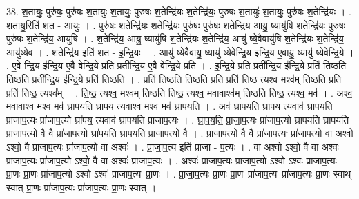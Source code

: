 \documentclass[17pt]{extarticle}
\begin{document}
38. श॒तायुः॒ पुरु॑षः॒ पुरु॑षः श॒तायुः॑ श॒तायुः॒ पुरु॑षः श॒तेन्द्रि॑यः श॒तेन्द्रि॑यः॒ पुरु॑षः श॒तायुः॑ श॒तायुः॒ पुरु॑षः श॒तेन्द्रि॑यः । . श॒तायु॒रिति॑ श॒त - आ॒युः॒ । . पुरु॑षः श॒तेन्द्रि॑यः श॒तेन्द्रि॑यः॒ पुरु॑षः॒ पुरु॑षः श॒तेन्द्रि॑य॒ आयु॒ ष्यायु॑षि श॒तेन्द्रि॑यः॒ पुरु॑षः॒ पुरु॑षः श॒तेन्द्रि॑य॒ आयु॑षि । . श॒तेन्द्रि॑य॒ आयु॒ ष्यायु॑षि श॒तेन्द्रि॑यः श॒तेन्द्रि॑य॒ आयु॑ ष्ये॒वैवायु॑षि श॒तेन्द्रि॑यः श॒तेन्द्रि॑य॒ आयु॑ष्ये॒व । . श॒तेन्द्रि॑य॒ इति॑ श॒त - इ॒न्द्रि॒यः॒ । . आयु॑ ष्ये॒वैवायु॒ ष्यायु॑ ष्ये॒वेन्द्रि॒य इ॑न्द्रि॒य ए॒वायु॒ ष्यायु॑ ष्ये॒वेन्द्रि॒ये । . ए॒वे न्द्रि॒य इ॑न्द्रि॒य ए॒वै वेन्द्रि॒ये प्रति॒ प्रती᳚न्द्रि॒य ए॒वै वेन्द्रि॒ये प्रति॑ । . इ॒न्द्रि॒ये प्रति॒ प्रती᳚न्द्रि॒य इ॑न्द्रि॒ये प्रति॑ तिष्ठति तिष्ठति॒ प्रती᳚न्द्रि॒य इ॑न्द्रि॒ये प्रति॑ तिष्ठति । . प्रति॑ तिष्ठति तिष्ठति॒ प्रति॒ प्रति॑ तिष्ठ॒ त्यश्व॒ मश्व॑म् तिष्ठति॒ प्रति॒ प्रति॑ तिष्ठ॒ त्यश्व᳚म् । . ति॒ष्ठ॒ त्यश्व॒ मश्व॑म् तिष्ठति तिष्ठ॒ त्यश्व॒ मवावाश्व॑म् तिष्ठति तिष्ठ॒ त्यश्व॒ मव॑ । . अश्व॒ मवावाश्व॒ मश्व॒ मव॑ घ्रापयति घ्रापय॒ त्यवाश्व॒ मश्व॒ मव॑ घ्रापयति । . अव॑ घ्रापयति घ्रापय॒ त्यवाव॑ घ्रापयति प्राजाप॒त्यः प्रा॑जाप॒त्यो घ्रा॑पय॒ त्यवाव॑ घ्रापयति प्राजाप॒त्यः । . घ्रा॒प॒य॒ति॒ प्रा॒जा॒प॒त्यः प्रा॑जाप॒त्यो घ्रा॑पयति घ्रापयति प्राजाप॒त्यो वै वै प्रा॑जाप॒त्यो घ्रा॑पयति घ्रापयति प्राजाप॒त्यो वै । . प्रा॒जा॒प॒त्यो वै वै प्रा॑जाप॒त्यः प्रा॑जाप॒त्यो वा अश्वो ऽश्वो॒ वै प्रा॑जाप॒त्यः प्रा॑जाप॒त्यो वा अश्वः॑ । . प्रा॒जा॒प॒त्य इति॑ प्राजा - प॒त्यः । . वा अश्वो ऽश्वो॒ वै वा अश्वः॑ प्राजाप॒त्यः प्रा॑जाप॒त्यो ऽश्वो॒ वै वा अश्वः॑ प्राजाप॒त्यः । . अश्वः॑ प्राजाप॒त्यः प्रा॑जाप॒त्यो ऽश्वो ऽश्वः॑ प्राजाप॒त्यः प्रा॒णः प्रा॒णः प्रा॑जाप॒त्यो ऽश्वो ऽश्वः॑ प्राजाप॒त्यः प्रा॒णः । . प्रा॒जा॒प॒त्यः प्रा॒णः प्रा॒णः प्रा॑जाप॒त्यः प्रा॑जाप॒त्यः प्रा॒णः स्वाथ् स्वात् प्रा॒णः प्रा॑जाप॒त्यः प्रा॑जाप॒त्यः प्रा॒णः स्वात् । \newline
\end{document}

